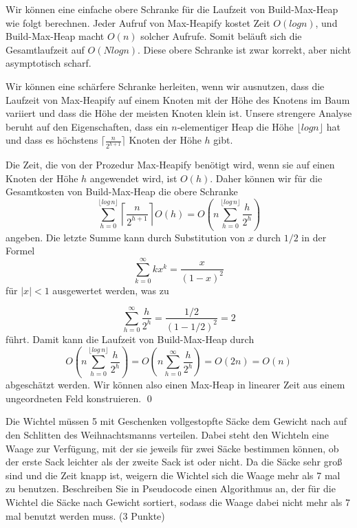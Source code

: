 \documentclass[ngerman,landscape,twocolumn]{adtexsheet}
\begin{document}
Wir können eine einfache obere Schranke für die Laufzeit von Build-Max-Heap wie folgt berechnen. Jeder Aufruf von Max-Heapify kostet Zeit $O(log n)$, und Build-Max-Heap macht $O(n)$ solcher Aufrufe. Somit beläuft sich die Gesamtlaufzeit auf $O(N log n)$. Diese obere Schranke ist zwar korrekt, aber nicht asymptotisch scharf.

Wir können eine schärfere Schranke herleiten, wenn wir ausnutzen, dass die Laufzeit von Max-Heapify auf einem Knoten mit der Höhe des Knotens im Baum variiert und dass die Höhe der meisten Knoten klein ist. Unsere strengere Analyse beruht auf den Eigenschaften, dass ein $n$-elementiger Heap die Höhe $\lfloor log n \rfloor$ hat und dass es höchstens $\lceil \frac{n}{2^{h+1}} \rceil$ Knoten der Höhe $h$ gibt.

Die Zeit, die von der Prozedur Max-Heapify benötigt wird, wenn sie auf einen Knoten der Höhe $h$ angewendet wird, ist $O(h)$. Daher können wir für die Gesamtkosten von Build-Max-Heap die obere Schranke
\[
\sum_{h=0}^{\lfloor log\,n \rfloor} \left\lceil \frac{n}{2^{h+1}} \right\rceil O(h) = O\left( n \sum_{h=0}^{\lfloor log\,n \rfloor} \frac{h}{2^h} \right)
\]
angeben. Die letzte Summe kann durch Substitution von $x$ durch $1/2$ in der Formel
\[
\sum_{k=0}^{\infty} kx^k= \frac{x}{(1-x)^2}
\]
für $|x| < 1$ ausgewertet werden, was zu

\[
\sum_{h=0}^{\infty} \frac{h}{2^h} = \frac{1/2}{(1-1/2)^2} = 2
\]
führt. Damit kann die Laufzeit von Build-Max-Heap durch
\[
O \left( n \sum_{h=0}^{\lfloor log\,n \rfloor} \frac{h}{2^h}  \right) = O \left( n \sum_{h=0}^{\infty} \frac{h}{2^h}  \right) = O(2n) = O(n)
\]
abgeschätzt werden. Wir können also einen Max-Heap in linearer Zeit aus einem ungeordneten Feld konstruieren. \qed
\begin{question}
Die Wichtel müssen 5 mit Geschenken vollgestopfte Säcke dem Gewicht nach auf den
Schlitten des Weihnachtsmanns verteilen. Dabei steht den Wichteln eine Waage zur
Verfügung, mit der sie jeweils für zwei Säcke bestimmen können, ob der erste Sack leichter
als der zweite Sack ist oder nicht. Da die Säcke sehr groß sind und die Zeit knapp ist,
weigern die Wichtel sich die Waage mehr als 7 mal zu benutzen. Beschreiben Sie in
Pseudocode einen Algorithmus an, der für die Wichtel die Säcke nach Gewicht sortiert,
sodass die Waage dabei nicht mehr als 7 mal benutzt werden muss. (3 Punkte)\\
\end{question}
\end{document}
